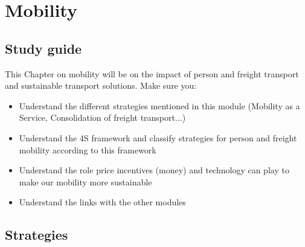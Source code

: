 \documentclass[../summary.tex]{subfiles}
\begin{document}
\section{Mobility}

\subsection{Study guide}

This Chapter on mobility will be on the impact of person and freight transport and sustainable transport solutions. Make sure you:
\begin{itemize}
	\item Understand the different strategies mentioned in this module (Mobility as a Service, Consolidation of freight transport...)
	\item Understand the 4S framework and classify strategies for person and freight mobility according to this framework
	\item Understand the role price incentives (money) and technology can play to make our mobility more sustainable
	\item Understand the links with the other modules
\end{itemize}

\subsection{Strategies}
\end{document}

